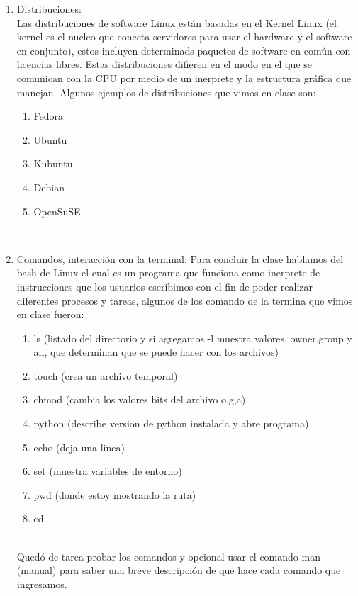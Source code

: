 \documentclass[letterpaper, 12pt, oneside]{article}
\begin{document}
\begin{enumerate}
		\item Distribuciones:\\
		Las distribuciones de software Linux est\'an basadas en el Kernel Linux (el kernel es el nucleo que conecta servidores para usar el hardware y el software en conjunto), estos incluyen determinads paquetes de software en com\'un con licencias libres. Estas distribuciones difieren en el modo en el que se comunican con la CPU por medio de un inerprete y la estructura gr\'afica que manejan. Algunos ejemplos de distribuciones que vimos en clase son:\\
		\begin{enumerate}
			\item Fedora
			\item Ubuntu
			\item Kubuntu
			\item Debian
			\item OpenSuSE
		\end{enumerate}\\
	
		\item Comandos, interacci\'on con la terminal:
		Para concluir la clase hablamos del bash de Linux el cual es un programa que funciona como inerprete de instrucciones que los usuarios escribimos con el fin de poder realizar diferentes procesos y tareas, algunos de los comando de la termina que vimos en clase fueron:
		\begin{enumerate}
			\item ls	(listado del directorio y si agregamos -l muestra valores, owner,group y all, que determinan que se puede hacer con los archivos)
			\item touch	(crea un archivo temporal)
			\item chmod	(cambia los valores bits del archivo o,g,a)
			\item python	(describe version de python instalada y abre programa)
			\item echo (deja una linea) 
			\item set	(muestra variables de entorno)
			\item pwd	(donde estoy mostrando la ruta)
			\item cd
		\end{enumerate}\\
		Qued\'o de tarea probar los comandos y opcional usar el comando man (manual) para saber una breve descripci\'on de que hace cada comando que ingresamos.
	\end{enumerate}
\end{document}
